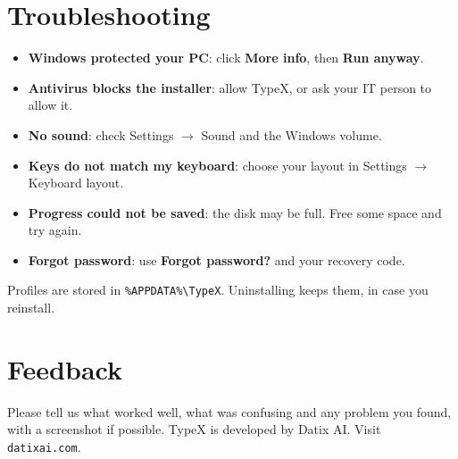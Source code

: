 \chapter{Troubleshooting}
\begin{itemize}
\item \textbf{Windows protected your PC}: click \textbf{More info}, then \textbf{Run anyway}.
\item \textbf{Antivirus blocks the installer}: allow TypeX, or ask your IT person to allow it.
\item \textbf{No sound}: check Settings $\rightarrow$ Sound and the Windows volume.
\item \textbf{Keys do not match my keyboard}: choose your layout in Settings $\rightarrow$ Keyboard layout.
\item \textbf{Progress could not be saved}: the disk may be full. Free some space and try again.
\item \textbf{Forgot password}: use \textbf{Forgot password?} and your recovery code.
\end{itemize}
Profiles are stored in \texttt{\%APPDATA\%\textbackslash{}TypeX}. Uninstalling keeps them, in case you reinstall.

\chapter{Feedback}
Please tell us what worked well, what was confusing and any problem you found, with a screenshot if possible.
TypeX is developed by Datix AI. Visit \texttt{datixai.com}.
